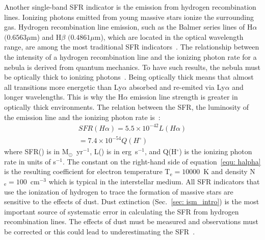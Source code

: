 Another single-band SFR indicator is the emission from hydrogen recombination lines. 
Ionizing photons emitted from young massive stars ionize the surrounding gas. Hydrogen recombination line emission, such as the Balmer series lines of H${\alpha}$ $(0.6563 \mu$m) and H${\beta}$ $(0.4861 \mu$m), which are located in the optical wavelength range, are among the most traditional SFR indicators~\citep{Kennicutt98a}. 
The relationship between the intensity of a hydrogen recombination line and the ionizing photon rate for a nebula is derived from quantum mechanics. 
To have such results, the nebula must be optically thick to ionizing photons~\citep{Osterbrock06}. %
Being optically thick means that almost all transitions more energetic than Ly${\alpha}$ absorbed and re-emited via Ly${\alpha}$ and longer wavelengths.
This is why the H${\alpha}$ emission line strength is greater in optically thick environments. The relation between the SFR, the luminosity of the \halpha emission line and the ionizing photon rate is~\citep[e.g.,][]{Osterbrock06, Kennicutt98b}:
\begin{align}
\label{equ: halpha}
SFR(H\alpha) = 5.5 \times 10^{-42}L(H\alpha) \\
                     = 7.4 \times 10^{-54}Q(H^{\circ})
\end{align}
where SFR(\halpha) is in M$_{\odot}$~yr$^{-1}$, L(\halpha) is in erg~s$^{-1}$, and Q(H$^{\circ}$) is the ionizing photon rate in units of s$^{-1}$.
The constant on the right-hand side of equation~\ref{equ: halpha} is the resulting coefficient for electron temperature T$_{\mathrm{e}}=10000$~K and density N$_{\mathrm{e}}=100$~cm$^{-3}$ which is typical in the interstellar medium. %
All SFR indicators that use the ionization of hydrogen to trace the formation of massive stars are sensitive to the effects of dust. %
Dust extinction (Sec.~\ref{sec: ism_intro}) is the most important source of systematic error in calculating the SFR from hydrogen recombination lines.
The effects of dust must be measured and \halpha observations must be corrected or this could lead to underestimating the SFR~\citep{Kennicutt98b}. %

